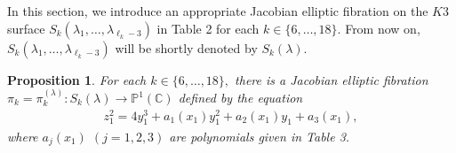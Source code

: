 \documentclass[10pt]{article}
\newtheorem{prop}{Proposition}[section]
\begin{document}
In this section, we introduce an appropriate Jacobian elliptic fibration on the $K3$ surface $S_k (\lambda_1,\ldots, \lambda_{\ell_k-3})$ in Table 2 for each $k\in\{6,\ldots, 18\}$. 
From now on,
$S_k (\lambda_1,\ldots, \lambda_{\ell_k-3})$ will be shortly denoted by
$S_k(\lambda)$. 



\begin{prop}\label{PropEquationJac}
For each $k\in \{6,\ldots, 18\},$
there is a Jacobian elliptic fibration 
$\pi_k=\pi_k^{(\lambda)}:S_k(\lambda) \rightarrow \mathbb{P}^1 (\mathbb{C})$
 defined by the equation
\begin{align}\label{EquationJac}
z_1^2 =4 y_1^3 + a_1 (x_1) y_1^2 + a_2(x_1) y_1 + a_3(x_1),
\end{align}
where $a_j (x_1)$ $(j=1,2,3)$ are polynomials given in Table 3.
\end{prop}
\end{document}
